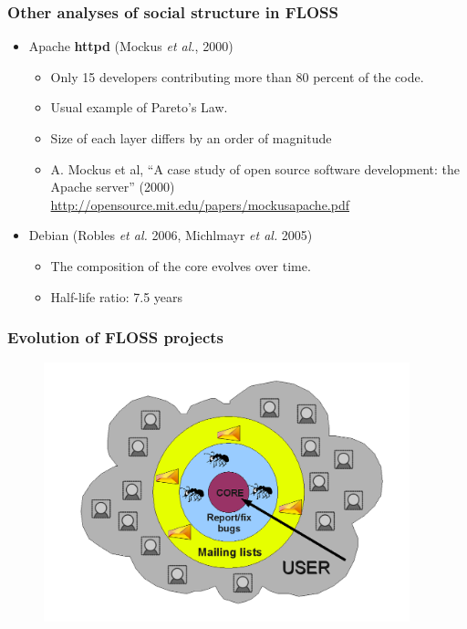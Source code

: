 \documentclass{beamer}
\begin{document}
\begin{frame}
 \frametitle{Other analyses of social structure in FLOSS}
 \begin{itemize}
  \item Apache \textbf{httpd} (Mockus \emph{et al.}, 2000)
  \begin{itemize}
   \item Only 15 developers contributing more than 80 percent
   of the code.
   \item Usual example of Pareto's Law.
   \item Size of each layer differs by an order of magnitude
    \item \begin{footnotesize}[Mockus 2000] A. Mockus et al, ``A case study of open source software development:
      the Apache server'' (2000)
      \url{http://opensource.mit.edu/papers/mockusapache.pdf}\end{footnotesize}
  \end{itemize}
  \item Debian (Robles \emph{et al.} 2006, Michlmayr \emph{et al.} 2005)
  \begin{itemize}
   \item The composition of the core evolves over time.
   \item Half-life ratio: 7.5 years
  \end{itemize}
 \end{itemize}
\end{frame}


\begin{frame}
\frametitle{Evolution of FLOSS projects}
\begin{center}
\begin{figure}
 \includegraphics[height=7.5cm]{figs/progression.png}
\end{figure}
\end{center}
\end{frame}
\end{document}

